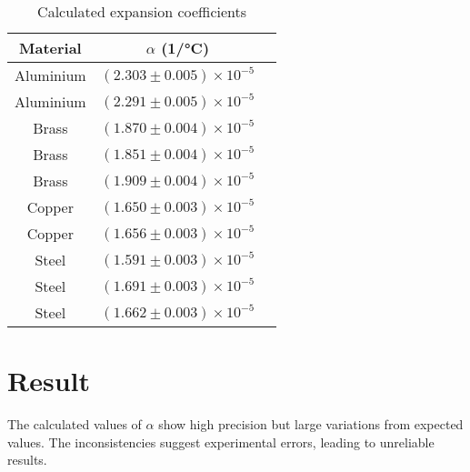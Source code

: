\documentclass[%
 sor,
 jor,
 amsmath,amssymb,
 reprint,
]{revtex4-2}
\begin{document}
\begin{table}[h]
\centering
\begin{tabular}{ccc}
\hline
Material & $\alpha$ (\si{1/\degreeCelsius}) \\
\hline
Aluminium & $(2.303 \pm 0.005) \times 10^{-5}$ \\
Aluminium & $(2.291\pm 0.005) \times 10^{-5}$ \\
Brass & $(1.870\pm 0.004) \times 10^{-5}$ \\
Brass & $(1.851\pm 0.004) \times 10^{-5}$ \\
Brass & $(1.909\pm 0.004) \times 10^{-5}$ \\
Copper & $(1.650\pm 0.003) \times 10^{-5}$ \\
Copper & $(1.656\pm 0.003) \times 10^{-5}$ \\
Steel & $(1.591\pm 0.003) \times 10^{-5}$ \\
Steel & $(1.691\pm 0.003) \times 10^{-5}$ \\
Steel & $(1.662\pm 0.003) \times 10^{-5}$ \\
\hline


\end{tabular}
\caption{Calculated expansion coefficients}
\end{table}

\section{Result}
The calculated values of $\alpha$ show high precision but large variations from expected values. The inconsistencies suggest experimental errors, leading to unreliable results.
\end{document}
